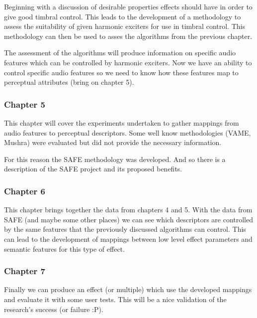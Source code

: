 \documentclass[a4paper]{article}
\begin{document}
	Beginning with a discussion of desirable properties effects should have in order to give good timbral control. This leads to the development of a methodology to assess the suitability of given harmonic exciters for use in timbral control. This methodology can then be used to asses the algorithms from the previous chapter.

	The assessment of the algorithms will produce information on specific audio features which can be controlled by harmonic exciters. Now we have an ability to control specific audio features so we need to know how these features map to perceptual attributes (bring on chapter 5).

	\subsubsection*{Chapter 5}
	This chapter will cover the experiments undertaken to gather mappings from audio features to perceptual descriptors. Some well know methodologies (VAME, Mushra) were evaluated but did not provide the necessary information.

	For this reason the SAFE methodology was developed. And so there is a description of the SAFE project and its proposed benefits.

	\subsubsection*{Chapter 6}
	This chapter brings together the data from chapters 4 and 5. With the data from SAFE (and maybe some other places) we can see which descriptors are controlled by the same features that the previously discussed algorithms can control. This can lead to the development of mappings between low level effect parameters and semantic features for this type of effect.

	\subsubsection*{Chapter 7}
	Finally we can produce an effect (or multiple) which use the developed mappings and evaluate it with some user tests. This will be a nice validation of the research's success (or failure :P).
\end{document}
